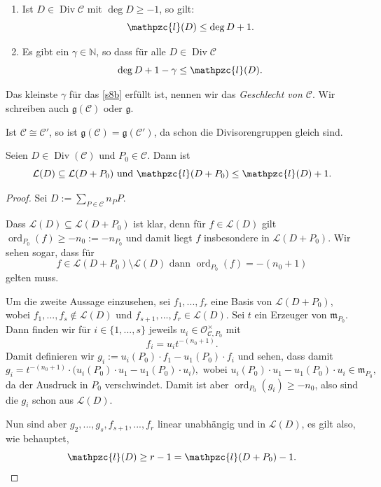 \documentclass[a4paper,12pt,index=toc]{scrbook}
\theoremstyle{keinenummern} %
\def\CC{\mathcal{C}}
\def\O{\mathcal{O}}
\newcommand{\g}{\mathfrak{g}}
\renewcommand{\L}{\mathcal{L}}
\def\ll{\mathpzc{l}}
\def\m{\mathfrak{m}}
\newcommand{\Div}{\operatorname{Div}}
\newcommand{\ord}{\operatorname{ord}}
\renewcommand{\dotsc}{\ensuremath{\!...}}
\newcommand{\set}[1]{\ensuremath{\mathbb{#1}}}
\newcommand{\N}{\set{N}}
\begin{document}
\begin{satz}[Riemann]\label{satz8}\begin{enumerate}
\item{} Ist $D\in\Div\CC$ mit $\deg D\geq-1$, so gilt:
\[\ll(D)\leq\deg D+1.\]
\item{} Es gibt ein $\gamma\in\N$, so dass für alle $D\in\Div\CC$
\[\deg D+1-\gamma\leq\ll(D).\]
\end{enumerate}\end{satz}

\begin{dfn}\label{4.3.3}
Das kleinste $\gamma$ für das \cref{s8b} erfüllt ist, nennen wir das \emph{Geschlecht von $\CC$}. Wir schreiben auch $\g(\CC)$ oder $\g$.
\end{dfn}

\begin{bem}\label{4.3.4}
Ist $\CC\cong\CC'$, so ist $\g(\CC)=\g(\CC')$, da schon die Divisorengruppen gleich sind.
\end{bem}

\begin{lem}\label{4.3.5}
Seien $D\in\Div(\CC)$ und $P_{0}\in\CC$. Dann ist
\[\L(D)\subseteq\L(D+P_{0})\text{ und }\ll(D+P_{0})\leq\ll(D)+1.\]
\end{lem}

\begin{proof}
Sei $D:=\sum\limits_{P\in\CC}n_{P}P$.

Dass $\L(D)\subseteq\L(D+P_{0})$ ist klar, denn für $f\in\L(D)$ gilt $\ord_{P_{0}}(f)\geq-n_{0}:=-n_{P_{0}}$ und damit liegt $f$ insbesondere in $\L(D+P_{0})$. Wir sehen sogar, dass für 
\[f\in\L(D+P_{0})\setminus\L(D)\text{ dann }\ord_{P_{0}}(f)=-(n_{0}+1)\] 
gelten muss.

Um die zweite Aussage einzusehen, sei $f_{1},\dotsc,f_{r}$ eine Basis von $\L(D+P_{0})$, wobei $f_{1},\dotsc,f_{s}\notin\L(D)$ und $f_{s+1},\dotsc,f_{r}\in\L(D)$. Sei $t$ ein Erzeuger von $\m_{P_{0}}$. Dann finden wir für $i\in\{1,\dotsc,s\}$ jeweils $u_{i}\in\O_{\CC,P_{0}}^{\times}$ mit 
\[f_{i}=u_{i}t^{-(n_{0}+1)}.\]
Damit definieren wir $g_{i}:=u_{i}(P_{0})\cdot f_{1}-u_{1}(P_{0})\cdot f_{i}$ und sehen, dass damit
\[g_{i} = t^{-(n_{0}+1)}\cdot\bigl(u_{i}(P_{0})\cdot u_{1}-u_{1}(P_{0})\cdot u_{i}\bigr),\text{ wobei }u_{i}(P_{0})\cdot u_{1}-u_{1}(P_{0})\cdot u_{i}\in\m_{P_{0}},\]
da der Ausdruck in $P_{0}$ verschwindet. Damit ist aber $\ord_{P_{0}}(g_{i})\geq-n_{0}$, also sind die $g_{i}$ schon aus $\L(D)$.

Nun sind aber $g_{2},\dotsc,g_{s},f_{s+1},\dotsc,f_{r}$ linear unabhängig und in $\L(D)$, es gilt also, wie behauptet,
\[\ll(D)\geq r-1=\ll(D+P_{0})-1.\]
\end{proof}
\end{document}
